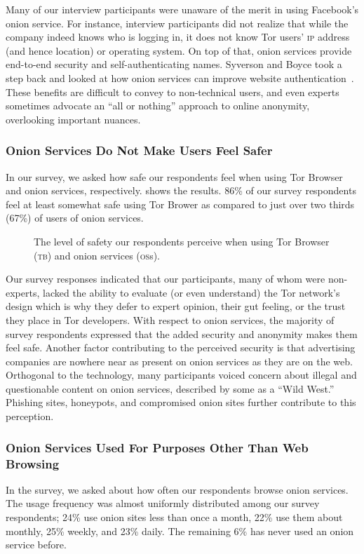 Many of our  interview participants were unaware of the merit in using Facebook's onion service. For instance, interview participants did not realize that while the company indeed
knows who is logging in, it does not know Tor users' \textsc{ip} address (and
hence location) or operating system.  On top of that, onion services provide
end-to-end security and self-authenticating names.  Syverson and Boyce took a
step back and looked at how onion services can improve website
authentication~\cite{Syverson2015a}.  These benefits are difficult to convey to
non-technical users, and even experts sometimes advocate an ``all or nothing''
approach to online anonymity, overlooking important nuances.

\subsubsection{Onion Services Do Not Make Users Feel Safer}
In our survey, we asked how safe our
respondents feel when using Tor Browser and onion services, respectively.
 shows the results.  
86\% of our survey respondents feel at least somewhat safe using Tor Brower as compared to just over two thirds (67\%) of users of onion services.

\begin{figure}[t]
    \centering
    
    \caption{The level of safety our respondents perceive when using Tor
    Browser (\textsc{tb}) and onion services (\textsc{os}s).}
    \label{fig:perceived-security}
\end{figure}

Our survey responses indicated that our participants, many of whom were non-experts, lacked the ability to evaluate (or even understand) the
Tor network's design which is why they defer to expert opinion, their gut
feeling, or the trust they place in Tor developers.  With respect to onion
services, the majority of survey respondents expressed that the added security and anonymity makes
them feel safe.  Another factor contributing to the perceived security is that
advertising companies are nowhere near as present on onion services as they are
on the web.  Orthogonal to the technology, many participants voiced concern
about illegal and questionable content on onion services, described by some as a
``Wild West.'' Phishing sites, honeypots, and compromised onion sites further
contribute to this perception.

\subsubsection{Onion Services Used For Purposes Other Than Web Browsing}
In the survey, we asked about how often our respondents browse onion
services.  The usage frequency was almost uniformly distributed among our survey
respondents; 24\% use onion sites less than once a month, 22\% use them about
monthly, 25\% weekly, and 23\% daily.  The remaining 6\% has never used an onion
service before.

